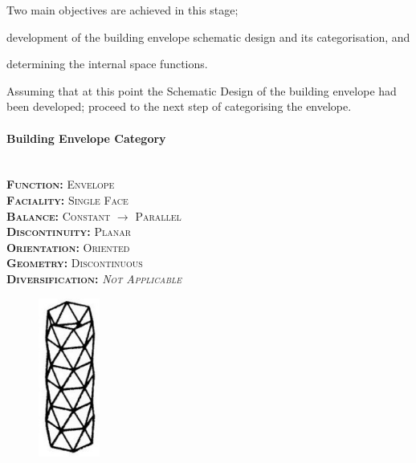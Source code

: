 Two main objectives are achieved in this stage; \begin{inparaenum}[a)] \item development of the building envelope schematic design and its categorisation, and \item determining the internal space functions.\end{inparaenum}

Assuming that at this point the Schematic Design of the building envelope had been developed; proceed to the next step of categorising the envelope.

\setlength{\columnseprule}{0pt}
\begin{multicols}{2}
	\paragraph{Building Envelope Category}\mbox{}\\
	\vspace {0.5cm}	
	\small \textsc{\textbf{Function:} Envelope\\
	\vspace {0.3cm}
	\textbf{Faciality:} Single Face\\
	\vspace {0.3cm}
	\textbf{Balance:} Constant $\rightarrow$ Parallel\\
	\vspace {0.3cm}
	\textbf{Discontinuity:} Planar\\
	\vspace {0.3cm}
	\textbf{Orientation:} Oriented\\
	\vspace {0.3cm}
	\textbf{Geometry:} Discontinuous\\
	\vspace {0.3cm}
	\textbf{Diversification:} \emph{Not Applicable}\\}
	\normalsize
	\columnbreak
	\vspace{3.5cm}
	\begin{figure}[H]
		\centering
		\includegraphics[width=0.18\textwidth]{./Images/18-Envelope9}
	\end{figure}
\end{multicols}
\vspace{-5mm}

